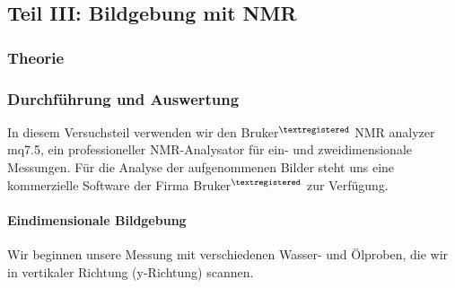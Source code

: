 \documentclass[a4paper]{scrartcl} %
\begin{document}
\newpage

\subsection{Teil III: Bildgebung mit NMR}

\subsubsection{Theorie}

\newpage

\subsubsection{Durchführung und Auswertung}

In diesem Versuchsteil verwenden wir den \textsf{Bruker$^{\textregistered}$ NMR analyzer mq7.5}, ein professioneller NMR-Analysator für ein- und zweidimensionale Messungen. Für die Analyse der aufgenommenen Bilder steht uns eine kommerzielle Software der Firma \textsf{Bruker$^{\textregistered}$} zur Verfügung.

\paragraph{Eindimensionale Bildgebung}

Wir beginnen unsere Messung mit verschiedenen Wasser- und Ölproben, die wir in vertikaler Richtung (y-Richtung) scannen.
\end{document}
